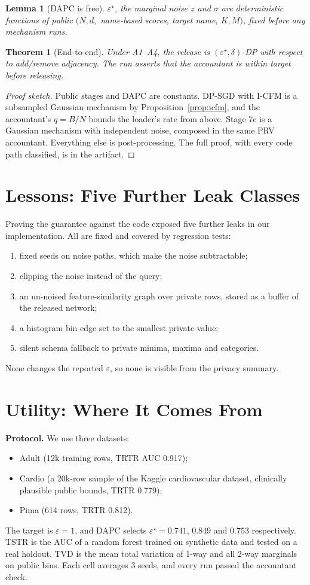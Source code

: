 \documentclass[journal]{IEEEtran}
\newtheorem{theorem}{Theorem}
\newtheorem{lemma}{Lemma}
\newcommand{\eps}{\varepsilon}
\begin{document}
\begin{lemma}[DAPC is free]
$\eps^\star$, the marginal noise $z$ and $\sigma$ are deterministic functions of public $(N,d,$ name-based scores, target name, $K, M)$, fixed before any mechanism runs.
\end{lemma}

\begin{theorem}[End-to-end]
Under A1--A4, the release is $(\eps^\star,\delta)$-DP with respect to add/remove adjacency. The run asserts that the accountant is within target before releasing.
\end{theorem}
\begin{proof}[Proof sketch]
Public stages and DAPC are constants. DP-SGD with I-CFM is a subsampled Gaussian mechanism by Proposition~\ref{prop:icfm}, and the accountant's $q=B/N$ bounds the loader's rate from above. Stage 7c is a Gaussian mechanism with independent noise, composed in the same PRV accountant. Everything else is post-processing. The full proof, with every code path classified, is in the artifact.
\end{proof}

\section{Lessons: Five Further Leak Classes}\label{sec:lessons}
Proving the guarantee against the code exposed five further leaks in our implementation. All are fixed and covered by regression tests:
\begin{enumerate}
\item fixed seeds on noise paths, which make the noise subtractable;
\item clipping the noise instead of the query;
\item an un-noised feature-similarity graph over private rows, stored as a buffer of the released network;
\item a histogram bin edge set to the smallest private value;
\item silent schema fallback to private minima, maxima and categories.
\end{enumerate}
None changes the reported $\eps$, so none is visible from the privacy summary.

\section{Utility: Where It Comes From}\label{sec:utility}
\textbf{Protocol.} We use three datasets:
\begin{itemize}
\item Adult (12k training rows, TRTR AUC 0.917);
\item Cardio (a 20k-row sample of the Kaggle cardiovascular dataset, clinically plausible public bounds, TRTR 0.779);
\item Pima (614 rows, TRTR 0.812).
\end{itemize}
The target is $\eps=1$, and DAPC selects $\eps^\star=0.741$, $0.849$ and $0.753$ respectively. TSTR is the AUC of a random forest trained on synthetic data and tested on a real holdout. TVD is the mean total variation of 1-way and all 2-way marginals on public bins. Each cell averages 3 seeds, and every run passed the accountant check.
\end{document}

